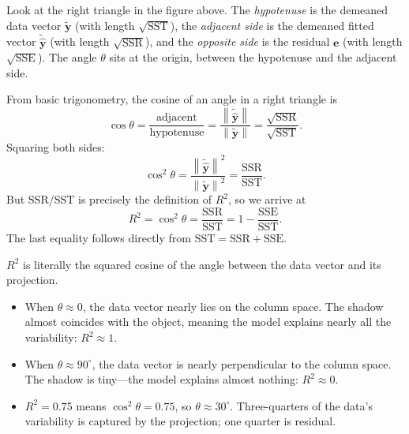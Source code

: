 \documentclass[11pt,a4paper]{article}
\theoremstyle{plain}
\theoremstyle{definition}
\newcommand{\yhat}{\hat{\bm{y}}}
\newcommand{\by}{\bm{y}}
\newcommand{\be}{\bm{e}}
\newcommand{\norm}[1]{\left\lVert #1 \right\rVert}
\begin{document}
Look at the right triangle in the figure above.
The \emph{hypotenuse} is the demeaned data vector $\tilde{\by}$ (with length $\sqrt{\text{SST}}$),
the \emph{adjacent side} is the demeaned fitted vector $\tilde{\yhat}$ (with length $\sqrt{\text{SSR}}$),
and the \emph{opposite side} is the residual $\be$ (with length $\sqrt{\text{SSE}}$).
The angle $\theta$ sits at the origin, between the hypotenuse and the adjacent side.

From basic trigonometry, the cosine of an angle in a right triangle is
\[
  \cos\theta = \frac{\text{adjacent}}{\text{hypotenuse}}
  = \frac{\norm{\tilde{\yhat}}}{\norm{\tilde{\by}}}
  = \frac{\sqrt{\text{SSR}}}{\sqrt{\text{SST}}}.
\]
Squaring both sides:
\[
  \cos^2\theta
  = \frac{\norm{\tilde{\yhat}}^2}{\norm{\tilde{\by}}^2}
  = \frac{\text{SSR}}{\text{SST}}.
\]
But $\text{SSR}/\text{SST}$ is precisely the definition of $R^2$, so we arrive at
\begin{equation}\label{eq:r2}
  \boxed{R^2 = \cos^2\theta = \frac{\text{SSR}}{\text{SST}}
  = 1 - \frac{\text{SSE}}{\text{SST}}.}
\end{equation}
The last equality follows directly from $\text{SST} = \text{SSR} + \text{SSE}$.

\begin{keyinsight}
$R^2$ is literally the squared cosine of the angle between the data vector
and its projection.
\begin{itemize}[nosep]
  \item When $\theta\approx 0$, the data vector nearly lies on the column space.
    The shadow almost coincides with the object, meaning the model explains
    nearly all the variability: $R^2\approx 1$.
  \item When $\theta\approx 90^\circ$, the data vector is nearly perpendicular to the
    column space.  The shadow is tiny---the model explains almost nothing:
    $R^2\approx 0$.
  \item $R^2 = 0.75$ means $\cos^2\theta = 0.75$, so $\theta\approx 30^\circ$.
    Three-quarters of the data's variability is captured by the
    projection; one quarter is residual.
\end{itemize}
\end{keyinsight}
\end{document}
